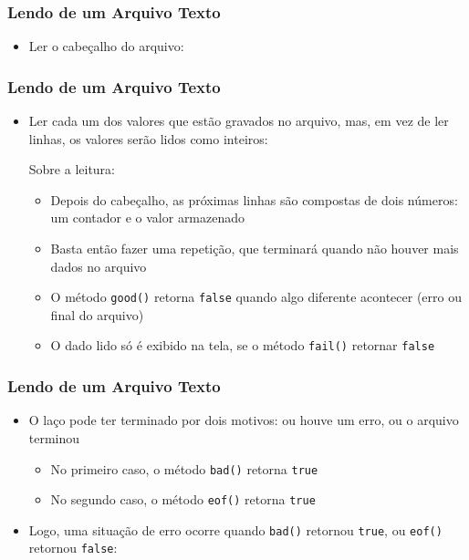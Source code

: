 \documentclass[aspectratio=169]{beamer}
\begin{document}
\begin{frame}[fragile]\frametitle{Lendo de um Arquivo Texto}
\begin{itemize}
	\item Ler o cabeçalho do arquivo:

\end{itemize}
\end{frame}

\begin{frame}[fragile]\frametitle{Lendo de um Arquivo Texto}
\begin{itemize}
	\item Ler cada um dos valores que estão gravados no arquivo, mas, em vez de ler linhas, os valores serão lidos como inteiros:

Sobre a leitura:
	\begin{itemize}
		\item Depois do cabeçalho, as próximas linhas são compostas de dois números: um contador e o valor armazenado
		\item Basta então fazer uma repetição, que terminará quando não houver mais dados no arquivo
		\item O método \texttt{good()} retorna \texttt{false} quando algo diferente acontecer (erro ou final do arquivo)
		\item O dado lido só é exibido na tela, se o método \texttt{fail()} retornar \texttt{false}
	\end{itemize}
\end{itemize}
\end{frame}

\begin{frame}[fragile]\frametitle{Lendo de um Arquivo Texto}
\begin{itemize}
	\item O laço pode ter terminado por dois motivos: ou houve um erro, ou o arquivo terminou
	\begin{itemize}
		\item No primeiro caso, o método \texttt{bad()} retorna \texttt{true}
		\item No segundo caso, o método \texttt{eof()} retorna \texttt{true}
	\end{itemize}
	\item Logo, uma situação de erro ocorre quando \texttt{bad()} retornou \texttt{true}, ou \texttt{eof()} retornou \texttt{false}:

\end{itemize}
\end{frame}
\end{document}
